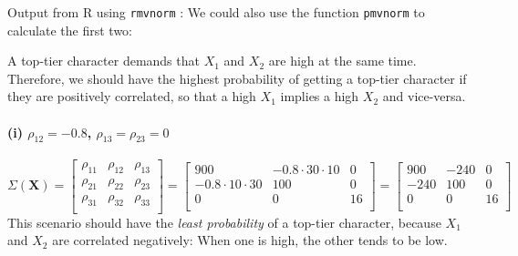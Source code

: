 \documentclass[a4paper,english,12pt]{article}
\begin{document}
Output from R using \texttt{rmvnorm} \cite{mvtnorm}:
We could also use the function \texttt{pmvnorm} to calculate the first two:

A top-tier character demands that  $X_1$ and $X_2$ are high at the
same time. Therefore, we should have the highest probability of getting a
top-tier character if they are positively correlated, so that a high $X_1$
implies a high $X_2$ and vice-versa.

\paragraph{(i)   $\rho_{12} =  -0.8$, $\rho_{13} = \rho_{23} = 0$}
\[
  \Sigma\left(\textbf{X}\right) =
    \begin{bmatrix}
      \rho_{11} & \rho_{12} & \rho_{13} \\
      \rho_{21} & \rho_{22} & \rho_{23} \\
      \rho_{31} & \rho_{32} & \rho_{33} \\
    \end{bmatrix}
  =
    \begin{bmatrix}
                         900 & -0.8 \cdot 30 \cdot 10 &    0 \\
      -0.8 \cdot 10 \cdot 30 &                    100 &    0 \\
                           0 &                      0 &   16 \\
    \end{bmatrix}
  =
    \begin{bmatrix}
                         900 &                   -240 &    0 \\
                        -240 &                    100 &    0 \\
                           0 &                      0 &   16 \\
    \end{bmatrix}
\]
This scenario should have the \textit{least probability} of a top-tier
character, because $X_1$ and $X_2$ are correlated negatively: When one is high,
the other tends to be low.
\end{document}
